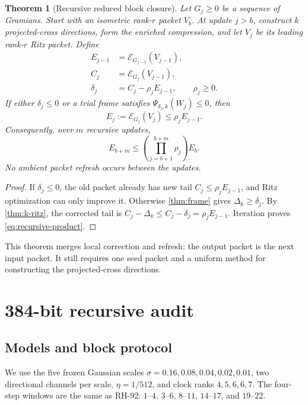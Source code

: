 \documentclass[11pt]{article}
\newtheorem{theorem}{Theorem}[section]
\theoremstyle{definition}
\theoremstyle{remark}
\newcommand{\E}{\mathcal E}
\begin{document}
\begin{theorem}[Recursive reduced block closure]
\label{thm:recursive}
Let $G_j\ge0$ be a sequence of Gramians.  Start with an isometric rank-$r$
packet $V_{b}$.  At update $j>b$, construct $k$ projected-cross directions,
form the enriched compression, and let $V_j$ be its leading rank-$r$ Ritz
packet.  Define
\begin{align}
 E_{j-1}&=\E_{G_{j-1}}(V_{j-1}),\\
 C_j&=\E_{G_j}(V_{j-1}),\\
 \delta_j&=C_j-\rho_jE_{j-1},\qquad \rho_j\ge0.
\end{align}
If either $\delta_j\le0$ or a trial frame satisfies
$\Psi_{\delta_j,k}(W_j)\le0$, then
\begin{equation}
 E_j:=\E_{G_j}(V_j)\le\rho_jE_{j-1}.
 \label{eq:recursive-step}
\end{equation}
Consequently, over $m$ recursive updates,
\begin{equation}
 E_{b+m}\le\left(\prod_{j=b+1}^{b+m}\rho_j\right)E_b.
 \label{eq:recursive-product}
\end{equation}
No ambient packet refresh occurs between the updates.
\end{theorem}

\begin{proof}
If $\delta_j\le0$, the old packet already has new tail
$C_j\le\rho_jE_{j-1}$, and Ritz optimization can only improve it.  Otherwise
\cref{thm:frame} gives $\Delta_k\ge\delta_j$.  By
\cref{thm:k-ritz}, the corrected tail is
$C_j-\Delta_k\le C_j-\delta_j=\rho_jE_{j-1}$.  Iteration proves
\eqref{eq:recursive-product}.
\end{proof}

This theorem merges local correction and refresh: the output packet is the
next input packet.  It still requires one seed packet and a uniform method for
constructing the projected-cross directions.

\section{384-bit recursive audit}

\subsection{Models and block protocol}

We use the five frozen Gaussian scales
$\sigma=0.16,0.08,0.04,0.02,0.01$, two directional channels per scale,
$\eta=1/512$, and clock ranks $4,5,6,6,7$.  The four-step windows are the
same as RH-92: $1$--$4$, $3$--$6$, $8$--$11$, $14$--$17$, and $19$--$22$.
\end{document}

